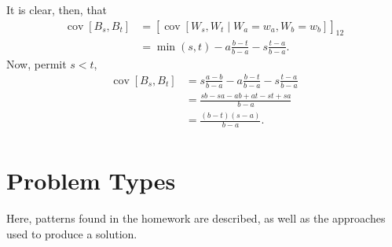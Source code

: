 \documentclass{article}[12pt]
\begin{document}
It is clear, then, that
\begin{equation}
	\begin{aligned}
	\operatorname{cov} \left[ B_s, B_t  \right] &= \left[ \operatorname{cov} \left[ W_s, W_t \middle| W_a = w_a, W_b=w_b  \right] \right]_{12} \\
						    &= \min (s, t) - a \frac{b-t}{b-a} - s \frac{t-a}{b -a} . 
	\end{aligned}
\end{equation}
Now, permit $s < t$,
\begin{equation}
	\begin{aligned}
		\operatorname{cov} \left[ B_s, B_t \right] &= s \frac{a-b}{b-a} -a \frac{b-t}{b-a}  - s \frac{t-a}{b-a} \\
							   &= \frac{sb - sa - ab + at - st + sa}{b-a}  \\
							   &=  \frac{(b-t)(s-a)}{b-a}. \\ 
	\end{aligned}
\end{equation}

\section{Problem Types}

Here, patterns found in the homework are described, as well as the approaches used to produce a solution.
\end{document}
